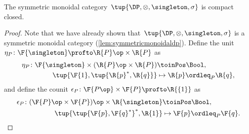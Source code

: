 \begin{lemma}
  \label{lem:DP-compact-closed}
  The symmetric monoidal category~$\tup{\DP,\otimes,\singleton,\sigma}$ is compact closed.
\end{lemma}
\begin{proof}
  Note that we have already shown that~$\tup{\DP,\otimes,\singleton,\sigma}$ is a symmetric monoidal category (\cref{lem:symmetricmonoidaldp}). Define the unit~$\eta_P\colon \F{\singleton} \profto \R{P}\op \times \R{P} $ as
  \begin{equation}
    \label{eq:unit_morphism}
    \begin{aligned}
      \eta_P \colon \F{\singleton} \times (\R{P}\op \times \R{P}) & \toinPos \Bool, \\
      \tup{\F{1},\tup{\R{p}^*,\R{q}}} & \mapsto \R{p} \ordleq_P \R{q},
    \end{aligned}
  \end{equation}
  and define the counit $\epsilon_P\colon \F{P\op} \times \F{P} \profto \R{\{1\}} $ as
  \begin{equation}
    \begin{aligned}
      \epsilon_P \colon (\F{P}\op \times \F{P})\op \times \R{\singleton} & \toinPos \Bool,  \\
      \tup{\tup{\F{p},\F{q}^*}^*, \R{1}} & \mapsto \F{p} \ordleq_P \F{q}.
    \end{aligned}
  \end{equation}


\end{proof}
